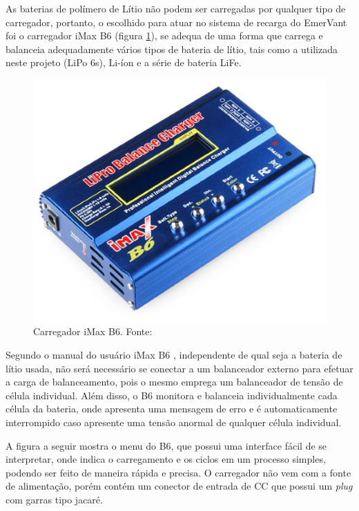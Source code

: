 As baterias de polímero de Lítio não podem ser carregadas por qualquer tipo de carregador, portanto, o escolhido para atuar no sistema de recarga do EmerVant foi o carregador iMax B6 (figura \ref{fig:carregador1}), se adequa de uma forma que carrega e balanceia adequadamente vários tipos de bateria de lítio, tais como a utilizada neste projeto (LiPo 6s), Li-íon e a série de bateria LiFe.


 \begin{figure}[H]
    \centering
	\includegraphics[keepaspectratio=true,scale=0.4]{figuras/carregador1.eps}
    \caption{Carregador iMax B6. Fonte: \cite{carregador1}}
    \label{fig:carregador1}
\end{figure}


Segundo o manual do usuário iMax B6 \cite{ibmax}, independente de qual seja a bateria de lítio usada, não será necessário se conectar a um balanceador externo para efetuar a carga de balanceamento, pois o mesmo emprega um balanceador de tensão de célula individual. Além disso, o B6 monitora e balanceia individualmente cada célula da bateria, onde apresenta uma mensagem de erro e é automaticamente interrompido caso apresente uma tensão anormal de qualquer célula individual. 

A figura a seguir mostra o menu do B6, que possui uma interface fácil de se interpretar, onde indica o carregamento e os ciclos em um processo simples, podendo ser feito de maneira rápida e precisa. O carregador não vem com a fonte de alimentação, porém contém um conector de entrada de CC que possui um \textit{plug} com garras tipo jacaré.

